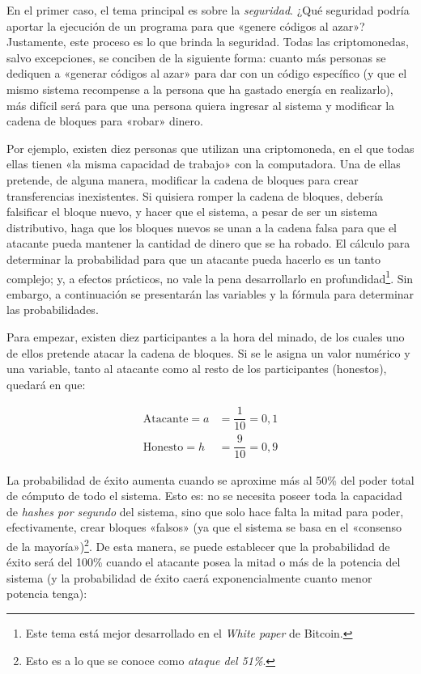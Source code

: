 \documentclass[12pt,a4paper,twoside]{book}
\begin{document}
En el primer caso, el tema principal es sobre la \textit{seguridad}. ¿Qué seguridad podría aportar la ejecución de un programa para que «genere códigos al azar»? Justamente, este proceso es lo que brinda la seguridad. Todas las criptomonedas, salvo excepciones, se conciben de la siguiente forma: cuanto más personas se dediquen a «generar códigos al azar» para dar con un código específico (y que el mismo sistema recompense a la persona que ha gastado energía en realizarlo), más difícil será para que una persona quiera ingresar al sistema y modificar la cadena de bloques para «robar» dinero.

Por ejemplo, existen diez personas que utilizan una criptomoneda, en el que todas ellas tienen «la misma capacidad de trabajo» con la computadora. Una de ellas pretende, de alguna manera, modificar la cadena de bloques para crear transferencias inexistentes. Si quisiera romper la cadena de bloques, debería falsificar el bloque nuevo, y hacer que el sistema, a pesar de ser un sistema distributivo, haga que los bloques nuevos se unan a la cadena falsa para que el atacante pueda mantener la cantidad de dinero que se ha robado. El cálculo para determinar la probabilidad para que un atacante pueda hacerlo es un tanto complejo; y, a efectos prácticos, no vale la pena desarrollarlo en profundidad\footnote{Este tema está mejor desarrollado en el \textit{White paper} de Bitcoin.}. Sin embargo, a continuación se presentarán las variables y la fórmula para determinar las probabilidades.

Para empezar, existen diez participantes a la hora del minado, de los cuales uno de ellos pretende atacar la cadena de bloques. Si se le asigna un valor numérico y una variable, tanto al atacante como al resto de los participantes (honestos), quedará en que:

\begin{align*}
\text{Atacante} = a &= \dfrac{1}{10} = 0,1 \\
\text{Honesto} = h &= \dfrac{9}{10} = 0,9
\end{align*}

La probabilidad de éxito aumenta cuando se aproxime más al 50\% del poder total de cómputo de todo el sistema. Esto es: no se necesita poseer toda la capacidad de \textit{hashes por segundo} del sistema, sino que solo hace falta la mitad para poder, efectivamente, crear bloques «falsos» (ya que el sistema se basa en el «consenso de la mayoría»)\footnote{Esto es a lo que se conoce como \textit{ataque del 51\%}.}. De esta manera, se puede establecer que la probabilidad de éxito será del 100\% cuando el atacante posea la mitad o más de la potencia del sistema (y la probabilidad de éxito caerá exponencialmente cuanto menor potencia tenga):
\end{document}
